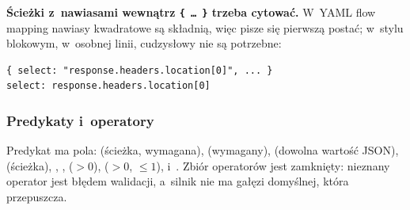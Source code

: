 \textbf{Ścieżki z~nawiasami wewnątrz \texttt{\{ … \}} trzeba cytować.} W~YAML flow mapping
nawiasy kwadratowe są składnią, więc pisze się pierwszą postać; w~stylu blokowym, w~osobnej
linii, cudzysłowy nie są potrzebne:

\begin{lstlisting}
{ select: "response.headers.location[0]", ... }
select: response.headers.location[0]
\end{lstlisting}

\subsubsection{Predykaty i~operatory}

Predykat ma pola:  (ścieżka, wymagana),  (wymagany),
 (dowolna wartość JSON),  (ścieżka), ,
,  ($> 0$),  ($> 0$, $\leq 1$),
 i~. Zbiór operatorów jest zamknięty: nieznany
operator jest błędem walidacji, a~silnik nie ma gałęzi domyślnej, która przepuszcza.

